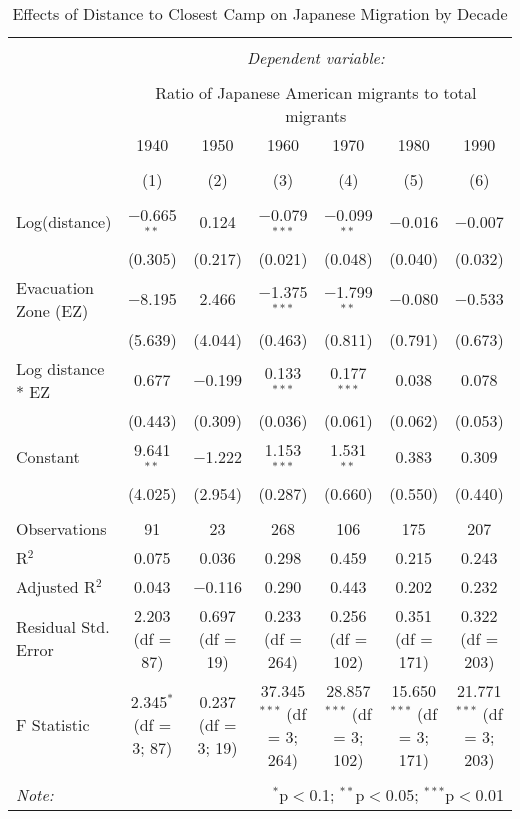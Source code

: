 
\begin{table}[!htbp] \centering 
  \caption{Effects of Distance to Closest Camp on Japanese Migration by Decade} 
  \label{} 
\begin{tabular}{@{\extracolsep{5pt}}lcccccc} 
\\[-1.8ex]\hline 
\hline \\[-1.8ex] 
 & \multicolumn{6}{c}{\textit{Dependent variable:}} \\ 
\cline{2-7} 
\\[-1.8ex] & \multicolumn{6}{c}{Ratio of Japanese American migrants to total migrants} \\ 
 & 1940 & 1950 & 1960 & 1970 & 1980 & 1990 \\ 
\\[-1.8ex] & (1) & (2) & (3) & (4) & (5) & (6)\\ 
\hline \\[-1.8ex] 
 Log(distance) & $-$0.665$^{**}$ & 0.124 & $-$0.079$^{***}$ & $-$0.099$^{**}$ & $-$0.016 & $-$0.007 \\ 
  & (0.305) & (0.217) & (0.021) & (0.048) & (0.040) & (0.032) \\ 
  Evacuation Zone (EZ) & $-$8.195 & 2.466 & $-$1.375$^{***}$ & $-$1.799$^{**}$ & $-$0.080 & $-$0.533 \\ 
  & (5.639) & (4.044) & (0.463) & (0.811) & (0.791) & (0.673) \\ 
  Log distance * EZ  & 0.677 & $-$0.199 & 0.133$^{***}$ & 0.177$^{***}$ & 0.038 & 0.078 \\ 
  & (0.443) & (0.309) & (0.036) & (0.061) & (0.062) & (0.053) \\ 
  Constant & 9.641$^{**}$ & $-$1.222 & 1.153$^{***}$ & 1.531$^{**}$ & 0.383 & 0.309 \\ 
  & (4.025) & (2.954) & (0.287) & (0.660) & (0.550) & (0.440) \\ 
 \hline \\[-1.8ex] 
Observations & 91 & 23 & 268 & 106 & 175 & 207 \\ 
R$^{2}$ & 0.075 & 0.036 & 0.298 & 0.459 & 0.215 & 0.243 \\ 
Adjusted R$^{2}$ & 0.043 & $-$0.116 & 0.290 & 0.443 & 0.202 & 0.232 \\ 
Residual Std. Error & 2.203 (df = 87) & 0.697 (df = 19) & 0.233 (df = 264) & 0.256 (df = 102) & 0.351 (df = 171) & 0.322 (df = 203) \\ 
F Statistic & 2.345$^{*}$ (df = 3; 87) & 0.237 (df = 3; 19) & 37.345$^{***}$ (df = 3; 264) & 28.857$^{***}$ (df = 3; 102) & 15.650$^{***}$ (df = 3; 171) & 21.771$^{***}$ (df = 3; 203) \\ 
\hline 
\hline \\[-1.8ex] 
\textit{Note:}  & \multicolumn{6}{r}{$^{*}$p$<$0.1; $^{**}$p$<$0.05; $^{***}$p$<$0.01} \\ 
\end{tabular} 
\end{table} 
